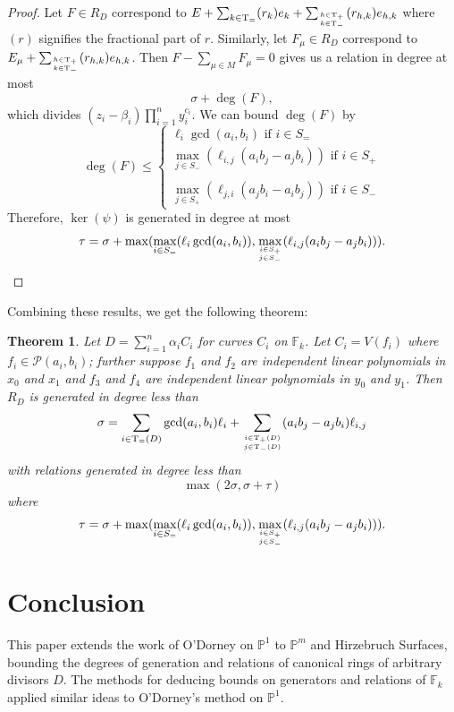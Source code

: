 \documentclass{amsart}
\theoremstyle{plain}
\newtheorem{thm}{Theorem}[section]
\theoremstyle{definition}
\theoremstyle{remark}
\numberwithin{equation}{section}
\newcommand\bida{a}
\newcommand\bidb{b}
\newcommand\hirz{\mathbb{F}}
\DeclareMathOperator{\Te}{T_=}
\DeclareMathOperator{\Tp}{T_+}
\DeclareMathOperator{\Tm}{T_-}
\begin{document}
\begin{proof}
Let $F\in R_D$ correspond to $E + \sum_{k\in \Te} (r_k) e_k + \sum_{h\in \Tp \atop k\in \Tm} (r_{h,k}) e_{h,k}$ where $(r)$ signifies the fractional part of $r$.  Similarly, let $F_\mu \in R_D$ correspond to $E_\mu + \sum_{h\in \Tp \atop k\in \Tm} (r_{h,k}) e_{h,k}$.  Then $F - \sum_{\mu\in M} F_\mu = 0$ gives us a relation in degree at most
\[
	\sigma + \deg(F),
\]
which divides $(z_i - \beta_i) \prod_{i=1}^n y_i^{c_i}$.
We can bound $\deg(F)$ by
\[
	\deg(F) \le \left\{ \begin{split}  \ell_i \gcd(\bida_i, \bidb_i) \mbox{ if } i \in S_= 
			\\ \max_{j\in S_-}(\ell_{i,j} (\bida_i \bidb_
j - \bida_j \bidb_i)) \mbox{ if } i\in S_+ \\
			\\ \max_{j\in S_+}(\ell_{j, i} (\bida_j \bidb_
i - \bida_i \bidb_j)) \mbox{ if } i \in S_- \end{split}  \right.
\]
Therefore, $\ker(\psi)$ is generated in degree at most
\[
	\tau = \sigma
	+ \max( \max_{i\in S_=}(\ell_i \gcd(a_i, b_i)), \max_{i\in S_+ \atop j\in S_-}(\ell_{i,j} (\bida_i \bidb_j - \bida_j \bidb_i))).
\]
\end{proof}

Combining these results, we get the following theorem:

\begin{thm}\label{Hirzebruch-generators/relations}
Let $D = \sum_{i=1}^n \alpha_i C_i$ for curves $C_i$ on $\hirz_k$.  Let $C_i = V(f_i)$ where $f_i \in \mathscr{P}(a_i, b_i)$; further suppose $f_1$ and $f_2$ are independent linear
polynomials in $x_0$ and $x_1$ and $f_3$ and $f_4$ are independent
linear polynomials in $y_0$ and $y_1$.
Then $R_D$ is generated in degree less than 
\[
	\sigma = \sum_{i\in \Te(D)} \gcd(\bida_i, \bidb_i)\ell_i + \sum_{i\in \Tp(D) \atop
	j \in \Tm(D)} (\bida_i \bidb_j- \bida_j \bidb_i)\ell_{i,j}
\]
with relations generated in degree less than 
\[
	\max(2 \sigma, \sigma + \tau)
\]
where
\[
	\tau = \sigma
	+ \max( \max_{i\in S_=}(\ell_i \gcd(a_i, b_i)), \max_{i\in S_+ \atop j\in S_-}(\ell_{i,j} (\bida_i \bidb_j - \bida_j \bidb_i))).
\]
\end{thm}


\section{Conclusion}
This paper extends the work of O'Dorney on $\mathbb{P}^1$ to $\mathbb{P}^m$ and Hirzebruch Surfaces, bounding the degrees of generation and relations of canonical rings of arbitrary divisors $D$.  The methods for deducing bounds on generators and relations of $\hirz_k$ applied similar ideas to O'Dorney's method on $\mathbb{P}^1$.  
\end{document}
